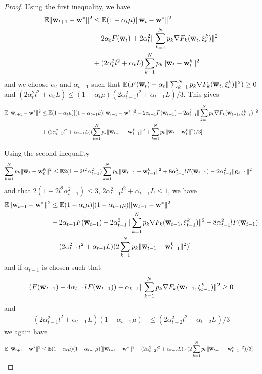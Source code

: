 \begin{proof}
	
	Using the first inequality, we have 
	\begin{align*}
	\mathbb{E}\|{\overline{\mathbf{w}}}_{t+1}-{\mathbf{w}}^{\ast}\|^{2} & \leq\mathbb{E}(1-\alpha_{t}\mu)\|{\overline{\mathbf{w}}}_{t}-{\mathbf{w}}^{\ast}\|^{2}\\
	& -2\alpha_{t}F({\overline{\mathbf{w}}}_{t})+2\alpha_{t}^{2}\|\sum_{k=1}^{N}p_{k}\nabla F_{k}({\overline{\mathbf{w}}}_{t},\xi_{t}^{k})\|^{2}\\
	& +(2\alpha_{t}^{2}l^{2}+\alpha_{t}L)\sum_{k=1}^{N}p_{k}\|{\overline{\mathbf{w}}}_{t}-{\mathbf{w}}_{t}^{k}\|^{2}
	\end{align*}
	and we choose $\alpha_{t}$ and $\alpha_{t-1}$ such that $\mathbb{E}(F({\overline{\mathbf{w}}}_{t})-\alpha_{t}\|\sum_{k=1}^{N}p_{k}\nabla F_{k}({\overline{\mathbf{w}}}_{t},\xi_{t}^{k})\|^{2})\geq0$
	and $(2\alpha_{t}^{2}l^{2}+\alpha_{t}L)\leq(1-\alpha_{t}\mu)(2\alpha_{t-1}^{2}l^{2}+\alpha_{t-1}L)/3$.
	This gives 
	\begin{align*}
	\mathbb{E}\|{\overline{\mathbf{w}}}_{t+1}-{\mathbf{w}}^{\ast}\|^{2} & \leq\mathbb{E}(1-\alpha_{t}\mu)[(1-\alpha_{t-1}\mu)\|{\overline{\mathbf{w}}}_{t-1}-{\mathbf{w}}^{\ast}\|^{2}-2\alpha_{t-1}F({\overline{\mathbf{w}}}_{t-1})+2\alpha_{t-1}^{2}\|\sum_{k=1}^{N}p_{k}\nabla F_{k}({\overline{\mathbf{w}}}_{t-1},\xi_{t-1}^{k})\|^{2}\\
	& +(2\alpha_{t-1}^{2}l^{2}+\alpha_{t-1}L)(\sum_{k=1}^{N}p_{k}\|{\overline{\mathbf{w}}}_{t-1}-{\mathbf{w}}_{t-1}^{k}\|^{2}+\sum_{k=1}^{N}p_{k}\|{\overline{\mathbf{w}}}_{t}-{\mathbf{w}}_{t}^{k}\|^{2})/3]
	\end{align*}
	
	Using the second inequality
	\begin{align*}
	\sum_{k=1}^{N}p_{k}\|{\overline{\mathbf{w}}}_{t}-{\mathbf{w}}_{t}^{k}\|^{2} & \leq\mathbb{E}2(1+2l^{2}\alpha_{t-1}^{2})\sum_{k=1}^{N}p_{k}\|{\overline{\mathbf{w}}}_{t-1}-{\mathbf{w}}_{t-1}^{k}\|^{2}+8\alpha_{t-1}^{2}lF({\overline{\mathbf{w}}}_{t-1})-2\alpha_{t-1}^{2}\|{\mathbf{g}}_{t-1}\|^{2}
	\end{align*}
	and that $2(1+2l^{2}\alpha_{t-1}^{2})\leq3$, $2\alpha_{t-1}^{2}l^{2}+\alpha_{t-1}L\le1$,
	we have 
	\begin{align*}
	\mathbb{E}\|{\overline{\mathbf{w}}}_{t+1}-{\mathbf{w}}^{\ast}\|^{2} & \leq\mathbb{E}(1-\alpha_{t}\mu)[(1-\alpha_{t-1}\mu)\|{\overline{\mathbf{w}}}_{t-1}-{\mathbf{w}}^{\ast}\|^{2}\\
	& -2\alpha_{t-1}F({\overline{\mathbf{w}}}_{t-1})+2\alpha_{t-1}^{2}\|\sum_{k=1}^{N}p_{k}\nabla F_{k}({\overline{\mathbf{w}}}_{t-1},\xi_{t-1}^{k})\|^{2}+8\alpha_{t-1}^{2}lF({\overline{\mathbf{w}}}_{t-1})\\
	& +(2\alpha_{t-1}^{2}l^{2}+\alpha_{t-1}L)(2\sum_{k=1}^{N}p_{k}\|{\overline{\mathbf{w}}}_{t-1}-{\mathbf{w}}_{t-1}^{k}\|^{2})]
	\end{align*}
	and if $\alpha_{t-1}$ is chosen such that 
	\begin{align*}
	(F({\overline{\mathbf{w}}}_{t-1})-4\alpha_{t-1}lF({\overline{\mathbf{w}}}_{t-1}))-\alpha_{t-1}\|\sum_{k=1}^{N}p_{k}\nabla F_{k}({\overline{\mathbf{w}}}_{t-1},\xi_{t-1}^{k})\|^{2}\geq0
	\end{align*}
	and
	\begin{align*} (2\alpha_{t-1}^{2}l^{2}+\alpha_{t-1}L)(1-\alpha_{t-1}\mu)
	&\leq(2\alpha_{t-2}^{2}l^{2}+\alpha_{t-2}L)/3
	\end{align*}
	we again have 
	\begin{align*}
	\mathbb{E}\|{\overline{\mathbf{w}}}_{t+1}-{\mathbf{w}}^{\ast}\|^{2} & \leq\mathbb{E}(1-\alpha_{t}\mu)(1-\alpha_{t-1}\mu)[\|{\overline{\mathbf{w}}}_{t-1}-{\mathbf{w}}^{\ast}\|^{2}+(2\alpha_{t-2}^{2}l^{2}+\alpha_{t-2}L)\cdot(2\sum_{k=1}^{N}p_{k}\|{\overline{\mathbf{w}}}_{t-1}-{\mathbf{w}}_{t-1}^{k}\|^{2})/3]
	\end{align*}
	

\end{proof}

